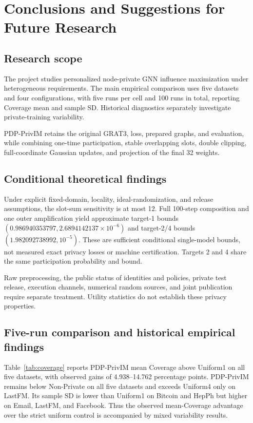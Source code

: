 \chapter{Conclusions and Suggestions for Future Research}\label{ch:conclusion}
\section{Research scope}
The project studies personalized node-private GNN influence maximization under heterogeneous requirements. The main empirical comparison uses five datasets and four configurations, with five runs per cell and 100 runs in total, reporting Coverage mean and sample SD. Historical diagnostics separately investigate private-training variability.

PDP-PrivIM retains the original GRAT3, loss, prepared graphs, and evaluation, while combining one-time participation, stable overlapping slots, double clipping, full-coordinate Gaussian updates, and projection of the final 32 weights.

\section{Conditional theoretical findings}
Under explicit fixed-domain, locality, ideal-randomization, and release assumptions, the slot-sum sensitivity is at most 12. Full 100-step composition and one outer amplification yield approximate target-1 bounds $(0.986940353797,2.6894142137\times10^{-6})$ and target-2/4 bounds $(1.982092738992,10^{-5})$. These are sufficient conditional single-model bounds, not measured exact privacy losses or machine certification. Targets 2 and 4 share the same participation probability and bound.

Raw preprocessing, the public status of identities and policies, private test release, execution channels, numerical random sources, and joint publication require separate treatment. Utility statistics do not establish these privacy properties.

\section{Five-run comparison and historical empirical findings}
Table~\ref{tab:coverage} reports PDP-PrivIM mean Coverage above Uniform1 on all five datasets, with observed gains of 4.938--14.762 percentage points. PDP-PrivIM remains below Non-Private on all five datasets and exceeds Uniform4 only on LastFM. Its sample SD is lower than Uniform1 on Bitcoin and HepPh but higher on Email, LastFM, and Facebook. Thus the observed mean-Coverage advantage over the strict uniform control is accompanied by mixed variability results.

